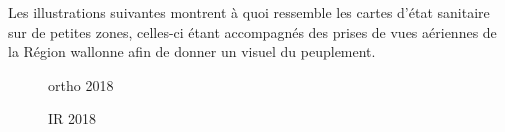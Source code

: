 \documentclass[a4paper, 12pt]{article} %
\begin{document}
Les illustrations suivantes montrent à quoi ressemble les cartes d'état sanitaire sur de petites zones, celles-ci étant accompagnés des prises de vues aériennes de la Région wallonne afin de donner un visuel du peuplement.

\begin{figure}
	\begin{minipage}[b]{.32\linewidth}
		\centering ortho 2018
	\end{minipage}%
	\begin{minipage}[b]{.32\linewidth}
		\centering IR 2018
	\end{minipage}
	\begin{minipage}[b]{.32\linewidth}

\end{minipage}
\end{figure}
\end{document}
